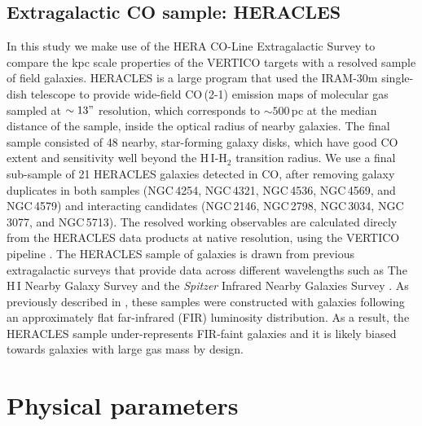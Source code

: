 \documentclass[longauth]{aa}
\begin{document}
\subsection{Extragalactic CO sample: HERACLES}
In this study we make use of the HERA CO-Line Extragalactic Survey \citep[HERACLES,][]{Leroy2009} to compare the kpc scale properties of the VERTICO targets with a resolved sample of field galaxies. HERACLES is a large program that used the IRAM-30m single-dish telescope to provide wide-field CO\,(2-1) emission maps of molecular gas sampled at $\sim 13"$ resolution, which corresponds to $\sim500$\,pc at the median distance of the sample, inside the optical radius of nearby galaxies. The final sample consisted of 48 nearby, star-forming galaxy disks, which have good CO extent and sensitivity well beyond the H\,I-H$_2$ transition radius. We use a final sub-sample of 21 HERACLES galaxies detected in CO, after removing galaxy duplicates in both samples (NGC\,4254, NGC\,4321, NGC\,4536, NGC\,4569, and NGC\,4579) and interacting candidates (NGC\,2146, NGC\,2798, NGC\,3034, NGC\,3077, and NGC\,5713). The resolved working observables are calculated direcly from the HERACLES data products at native resolution, using the VERTICO pipeline \citep[see][for a detailed description]{Brown2021}. The HERACLES sample of galaxies is drawn from previous extragalactic surveys that provide data across different wavelengths such as The H\,I Nearby Galaxy Survey \citep[THINGS,][]{Walter2008} and the {\it Spitzer} Infrared Nearby Galaxies Survey \citep[SINGS,][]{Kennicutt2003}. As previously described in \citet{Zabel2022}, these samples were constructed with galaxies following an approximately flat far-infrared (FIR) luminosity distribution. As a result, the HERACLES sample under-represents FIR-faint galaxies and it is likely biased towards galaxies with large gas mass by design. 

\section{Physical parameters}
\label{sec:methods}
\end{document}
